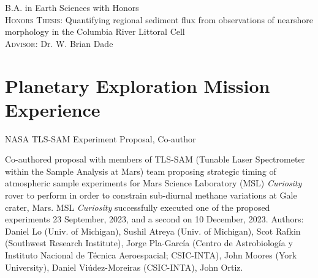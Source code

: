 \documentclass[11pt, letterpaper]{article}
\newcommand{\years}[1]{\marginnote{\scriptsize #1}}
\begin{document}
	\textsc{B.A.} in Earth Sciences with Honors\\
    \textsc{Honors Thesis:} Quantifying regional sediment flux from
    observations of nearshore morphology in the Columbia River Littoral Cell\\
    \textsc{Advisor:} Dr. W. Brian Dade


%
%
%

\section*{Planetary Exploration Mission Experience}
\label{sec:missions}  %
\noindent
\years{2023}NASA TLS-SAM Experiment Proposal, Co-author

    Co-authored proposal with members of TLS-SAM (Tunable Laser Spectrometer
    within the Sample Analysis at Mars) team proposing strategic timing of
    atmospheric sample experiments for Mars Science Laboratory (MSL)
    \textit{Curiosity} rover to perform in order to constrain sub-diurnal
    methane variations at Gale crater, Mars. MSL \textit{Curiosity}
    successfully executed one of the proposed experiments 23 September, 2023,
    and a second on 10 December, 2023. Authors: Daniel Lo (Univ. of Michigan),
    Sushil Atreya (Univ. of Michigan), Scot Rafkin (Southwest Research
    Institute), Jorge Pla-Garc\'{i}a (Centro de Astrobiolog\'{i}a y Instituto Nacional de T\'{e}cnica Aeroespacial; CSIC-INTA),
    John Moores (York University), Daniel Vi\'{u}dez-Moreiras (CSIC-INTA), John
    Ortiz.
\end{document}
